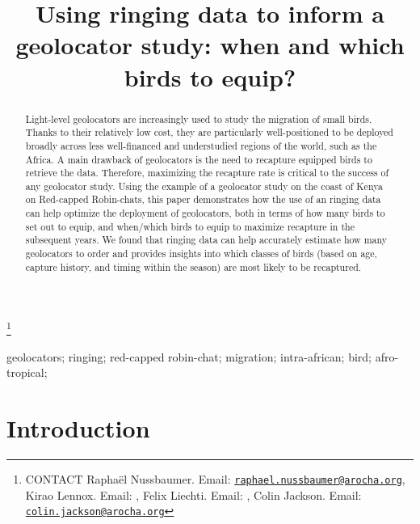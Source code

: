 \documentclass[]{interact}
\theoremstyle{plain}%
\theoremstyle{definition}
\theoremstyle{remark}
\begin{document}

\title{Using ringing data to inform a geolocator study: when and which birds to
equip?}


\author{
}

\thanks{CONTACT Raphaël Nussbaumer. Email: \href{mailto:raphael.nussbaumer@arocha.org}{\nolinkurl{raphael.nussbaumer@arocha.org}}, Kirao Lennox. Email: , Felix Liechti. Email: , Colin Jackson. Email: \href{mailto:colin.jackson@arocha.org}{\nolinkurl{colin.jackson@arocha.org}}}

\maketitle

\begin{abstract}
Light-level geolocators are increasingly used to study the migration of
small birds. Thanks to their relatively low cost, they are particularly
well-positioned to be deployed broadly across less well-financed and
understudied regions of the world, such as the Africa. A main drawback
of geolocators is the need to recapture equipped birds to retrieve the
data. Therefore, maximizing the recapture rate is critical to the
success of any geolocator study. Using the example of a geolocator study
on the coast of Kenya on Red-capped Robin-chats, this paper demonstrates
how the use of an ringing data can help optimize the deployment of
geolocators, both in terms of how many birds to set out to equip, and
when/which birds to equip to maximize recapture in the subsequent years.
We found that ringing data can help accurately estimate how many
geolocators to order and provides insights into which classes of birds
(based on age, capture history, and timing within the season) are most
likely to be recaptured.
\end{abstract}

\begin{keywords}
geolocators; ringing; red-capped robin-chat; migration; intra-african;
bird; afro-tropical;
\end{keywords}

\hypertarget{introduction}{%
\section{Introduction}\label{introduction}}
\end{document}
